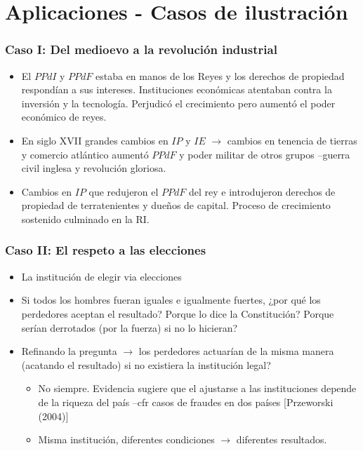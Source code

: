 \documentclass[handout,final,xcolor=dvipsnames]{beamer}
\begin{document}
\section{Aplicaciones - Casos de ilustración}

\begin{frame}\frametitle{Caso I: Del medioevo a la revolución industrial}
\begin{itemize}\itemsep 15pt
\item El $PPdI$ y $PPdF$ estaba en manos de los Reyes y los derechos
  de propiedad respondían a sus intereses. Instituciones económicas
  atentaban contra la inversión y la tecnología. Perjudicó el
  crecimiento pero aumentó el poder económico de reyes. 
\item En siglo XVII grandes cambios en $IP$ y $IE$ $\longrightarrow$
  cambios en tenencia de tierras y comercio atlántico aumentó $PPdF$
  y poder militar de otros grupos --guerra civil inglesa y revolución
  gloriosa. 
\item Cambios en $IP$ que redujeron el $PPdF$ del rey e introdujeron
  derechos de propiedad de terratenientes y dueños de capital. Proceso
  de crecimiento sostenido culminado en la RI. 
\end{itemize}
\end{frame}


\begin{frame}\frametitle{Caso II: El respeto a las elecciones}
\begin{itemize}\itemsep 15pt
\item La institución de elegir via elecciones
\item Si todos los hombres fueran iguales e igualmente fuertes, ¿por qué los perdedores aceptan el resultado? Porque lo dice la
  Constitución? Porque serían derrotados (por la fuerza) si no lo
  hicieran?
\item Refinando la pregunta $\longrightarrow$ los perdedores actuarían
  de la misma manera (acatando el resultado) si no existiera la
  institución legal?
\begin{itemize}\itemsep 15pt \medskip
\item No siempre. Evidencia sugiere que el ajustarse a las
  instituciones depende de la riqueza del país --cfr casos de fraudes
  en dos países [Przeworski (2004)]
\item Misma institución, diferentes condiciones $\longrightarrow$
  diferentes resultados. 
\end{itemize}
\end{itemize}
\end{frame}
\end{document}
